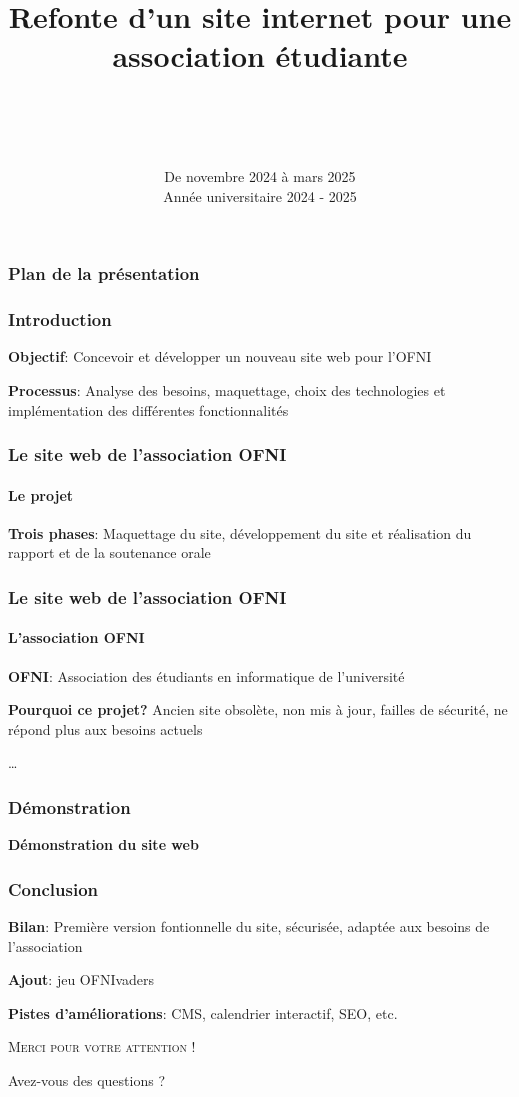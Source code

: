 \documentclass[pdf]{beamer}
\title[Refonte du site internet de l'association]{Refonte d'un site internet pour une association étudiante}
\author[OFNI]{
    \nom{Tristan}{Amiotte-Suchet} \\
    \nom{Antoine}{Cuinet} \\
    \nom{Gaspard}{Quentin} \\
}
\institute{Université de Franche Comté}
\date{De novembre 2024 à mars 2025 \\ Année universitaire 2024 - 2025}
\begin{document}

\begin{frame}
    \frametitle{Plan de la présentation}
    \tableofcontents[hideallsubsections]
\end{frame}


\begin{frame}
    \frametitle{Introduction}
    \centering
    \textbf{Objectif}: Concevoir et développer un nouveau site web pour l’OFNI
    \vspace{1cm}

    \textbf{Processus}: Analyse des besoins, maquettage, choix des technologies et implémentation des différentes fonctionnalités
\end{frame}

\begin{frame}
    \frametitle{Le site web de l’association OFNI}
    \framesubtitle{Le projet}
    \centering
    \textbf{Trois phases}: Maquettage du site, développement du site et réalisation du rapport et de la soutenance orale
\end{frame}

\begin{frame}
    \frametitle{Le site web de l’association OFNI}
    \framesubtitle{L’association OFNI}
    \centering
    \textbf{OFNI}: Association des étudiants en informatique de l’université
    \vspace{1cm}

    \textbf{Pourquoi ce projet?} Ancien site obsolète, non mis à jour, failles de sécurité, ne répond plus aux besoins actuels
\end{frame}





\begin{frame}
    \dots
\end{frame}






\begin{frame}
    \frametitle{Démonstration}
    \centering
    \textbf{Démonstration du site web}
\end{frame}

\begin{frame}
    \frametitle{Conclusion}
    \centering
    \textbf{Bilan}: Première version fontionnelle du site, sécurisée, adaptée aux besoins de l’association
    \vspace{1cm}

    \textbf{Ajout}: jeu OFNIvaders
    \vspace{1cm}

    \textbf{Pistes d'améliorations}: CMS, calendrier interactif, SEO, etc.
\end{frame}


\appendix
\begin{frame}
    \scshape\huge\centering
    \vspace{1cm}
    Merci pour votre attention !\par
    \vspace{2cm}
    Avez-vous des questions ?\par
\end{frame}
\end{document}
